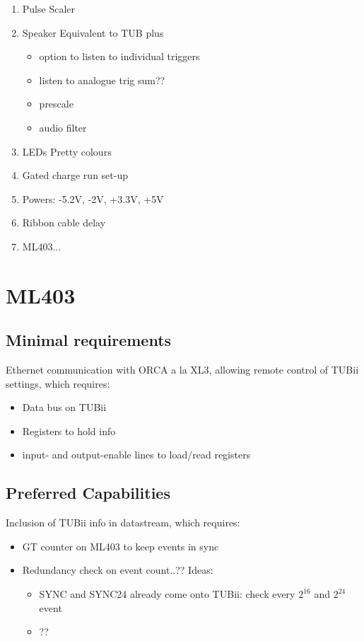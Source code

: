 \documentclass[letter, 11pt]{article}
\begin{document}
\begin{enumerate}
\item Pulse Scaler

\item Speaker
Equivalent to TUB plus
\begin{itemize}
\item option to listen to individual triggers
\item listen to analogue trig sum??
\item prescale
\item audio filter
\end{itemize}

\item LEDs
Pretty colours

\item Gated charge run set-up

\item Powers: -5.2V, -2V, +3.3V, +5V

\item Ribbon cable delay

\item ML403...

\end{enumerate}


\section{ML403}
\subsection{Minimal requirements}
 Ethernet communication with ORCA a la XL3, allowing remote control of TUBii settings, which requires:
\begin{itemize}
\item Data bus on TUBii
\item Registers to hold info
\item input- and output-enable lines to load/read registers
\end{itemize}

\subsection{Preferred Capabilities}
Inclusion of TUBii info in datastream, which requires:
\begin{itemize}
\item GT counter on ML403 to keep events in sync
\item Redundancy check on event count..??  Ideas:
\begin{itemize}
\item SYNC and SYNC24 already come onto TUBii: check every $2^{16}$ and $2^{24}$ event
\item ??
\end{itemize}
\end{itemize}
\end{document}
